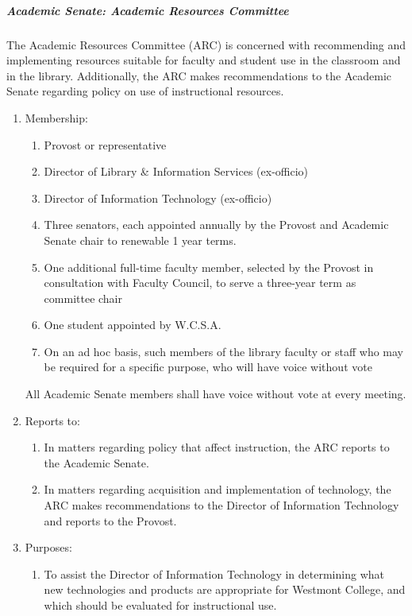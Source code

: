 \documentclass[letterpaper, 11pt]{article}
\begin{document}
				\subparagraph{Academic Senate:  Academic Resources Committee}
					The Academic Resources Committee (ARC) is concerned with recommending and implementing resources suitable for faculty and student use in the classroom and in the library.  Additionally, the ARC makes recommendations to the Academic Senate regarding policy on use of instructional resources.
					\begin{enumerate}[label=\alph*)]
						\item{Membership:
							\begin{enumerate}[label=\arabic*)]
								\item{Provost or representative}
								\item{Director of Library \& Information Services (ex-officio)}
								\item{Director of Information Technology (ex-officio)}
								\item{Three senators, each appointed annually by the Provost and Academic Senate chair to renewable 1 year terms.}
								\item{One additional full-time faculty member, selected by the Provost in consultation with Faculty Council, to serve a three-year term as committee chair}
								\item{One student appointed by W.C.S.A.}
								\item{On an ad hoc basis, such members of the library faculty or staff who may be required for a specific purpose, who will have voice without vote}
							\end{enumerate}
							All Academic Senate members shall have voice without vote at every meeting.
						}
						\item{Reports to:
							\begin{enumerate}[label=\arabic*)]
								\item{In matters regarding policy that affect instruction, the ARC reports to the Academic Senate.}
								\item{In matters regarding acquisition and implementation of technology, the ARC makes recommendations to the Director of Information Technology and reports to the Provost.}
							\end{enumerate}
						}
						\item{Purposes:
							\begin{enumerate}[label=\arabic*)]
								\item{To assist the Director of Information Technology in determining what new technologies and products are appropriate for Westmont College, and which should be evaluated for instructional use.}

\end{enumerate}}
\end{enumerate}
\end{document}
